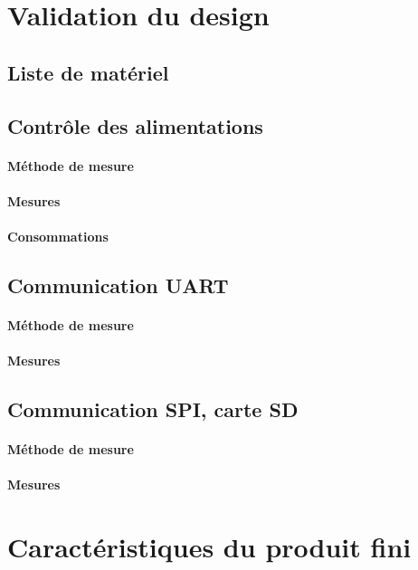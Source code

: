 \clearpage

\section{Validation du design} \label{sec:Validation-design}

\subsection{Liste de matériel} \label{ssec:Liste-materiel}

\subsection{Contrôle des alimentations} \label{ssec:Controle-alims}
\paragraph{Méthode de mesure}
\paragraph{Mesures}

\paragraph{Consommations}

\subsection{Communication UART} \label{ssec:Comm-UART}
\paragraph{Méthode de mesure}
\paragraph{Mesures}

\subsection{Communication SPI, carte SD} \label{ssec:Comm-SPI}
\paragraph{Méthode de mesure}
\paragraph{Mesures}

\section{Caractéristiques du produit fini} \label{sec:Carac-finis}
